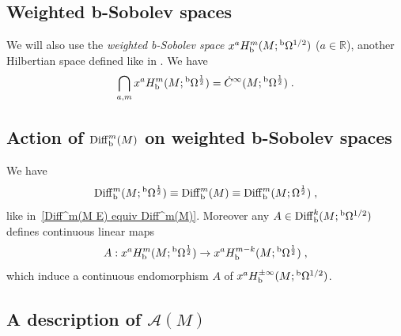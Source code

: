 \documentclass{memo-l}
\theoremstyle{plain}
\theoremstyle{definition}
\theoremstyle{remark}
\newcommand{\R}{\mathbb{R}}
\renewcommand{\AA}{\mathcal{A}}
\newcommand{\Diff}{\operatorname{Diff}}
\newcommand{\bOmega}{{}^{\text{\rm b}}\Omega}
\newcommand{\Diffb}{\Diff_{\text{\rm b}}}
\newcommand{\Hb}{H_{\text{\rm b}}}
\numberwithin{section}{chapter}
\numberwithin{equation}{section}%
\begin{document}
\subsection{Weighted b-Sobolev spaces}\label{ss: weighted b-Sobolev}

We will also use the \emph{weighted b-Sobolev space} $x^a\Hb^m(M;\bOmega^{1/2})$ ($a\in\R$), \index{$x^a\Hb^m(M;\bOmega^{1/2})$} another Hilbertian space defined like in . We have \cite[Section~6.19]{AlvKordyLeichtnam-conormal}
\[
\bigcap_{a,m}x^aH^m_{\text{\rm b}}(M;\bOmega^{\frac12})=\dot C^\infty(M;\bOmega^{\frac12})\;.
\]


\subsection{Action of $\Diffb^m(M)$ on weighted b-Sobolev spaces}
\label{ss: (pseudo) diff ops on weighted b-Sobolev}

We have
\begin{equation}\label{Diffb^m(M bOmega^1/2) equiv Diffb^m(M) equiv Diffb^m(M Omega^1/2)}
\Diffb^m(M;\bOmega^{\frac12})\equiv\Diffb^m(M)\equiv\Diffb^m(M;\Omega^{\frac12})\;,
\end{equation}
like in~\eqref{Diff^m(M E) equiv Diff^m(M)}. Moreover any $A\in\Diffb^k(M;\bOmega^{1/2})$ defines continuous linear maps \cite[Lemma 5.14]{Melrose1993}
\[
A:x^aH^m_{\text{\rm b}}(M;\bOmega^{\frac12})\to x^aH^{m-k}_{\text{\rm b}}(M;\bOmega^{\frac12})\;,
\]
which induce a continuous endomorphism $A$ of $x^aH^{\pm\infty}_{\text{\rm b}}(M;\bOmega^{1/2})$.


\subsection{A description of $\AA(M)$}\label{ss: a description of AA(M)}
\end{document}

